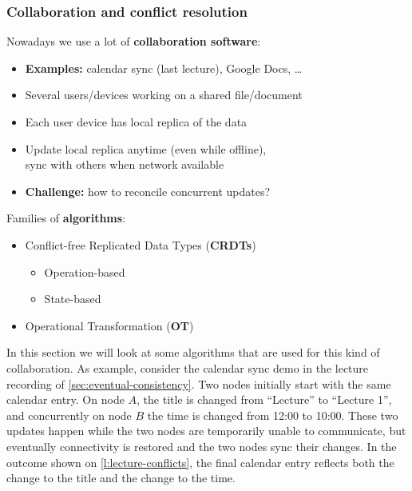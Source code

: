 \begin{frame}
    \label{s:collaboration}
    \frametitle{Collaboration and conflict resolution}
    Nowadays we use a lot of \textbf{collaboration software}:
    \begin{itemize}
        \item \textbf{Examples:} calendar sync (last lecture), Google Docs, \dots\pause
        \item Several users/devices working on a shared file/document
        \item Each user device has local replica of the data\pause
        \item Update local replica anytime (even while offline),\\sync with others when network available\pause
        \item \textbf{Challenge:} how to reconcile concurrent updates?\\[1em]\pause
    \end{itemize}
    Families of \textbf{algorithms}:
    \begin{itemize}
        \item Conflict-free Replicated Data Types (\textbf{CRDTs})
            \begin{itemize}
                \item Operation-based
                \item State-based
            \end{itemize}
        \item Operational Transformation (\textbf{OT})
    \end{itemize}
\end{frame}
\label{l:collaboration}

In this section we will look at some algorithms that are used for this kind of collaboration.
As example, consider the calendar sync demo in the lecture recording of \autoref{sec:eventual-consistency}.
Two nodes initially start with the same calendar entry.
On node $A$, the title is changed from ``Lecture'' to ``Lecture 1'', and concurrently on node $B$ the time is changed from 12:00 to 10:00.
These two updates happen while the two nodes are temporarily unable to communicate, but eventually connectivity is restored and the two nodes sync their changes.
In the outcome shown on \autoref{l:lecture-conflicts}, the final calendar entry reflects both the change to the title and the change to the time.

